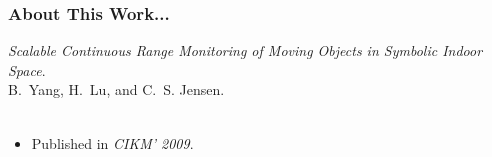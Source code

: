 \begin{frame}
\frametitle{About This Work...}

\emph{Scalable Continuous Range Monitoring of Moving Objects in Symbolic Indoor Space}.~\cite{DBLP:conf/cikm/YangLJ09} \\
B.~Yang, H.~Lu, and C.~S. Jensen.\\~\\

\begin{itemize}
  \item Published in \emph{CIKM' 2009}.
\end{itemize}

\end{frame}

